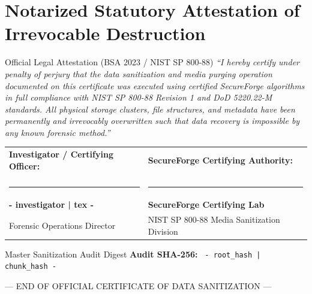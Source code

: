 \documentclass[12pt]{article}
\begin{document}
\section{Notarized Statutory Attestation of Irrevocable Destruction}

\begin{statutorybox}{Official Legal Attestation (BSA 2023 / NIST SP 800-88)}
\textit{``I hereby certify under penalty of perjury that the data sanitization and media purging operation documented on this certificate was executed using certified SecureForge algorithms in full compliance with NIST SP 800-88 Revision 1 and DoD 5220.22-M standards. All physical storage clusters, file structures, and metadata have been permanently and irrevocably overwritten such that data recovery is impossible by any known forensic method.''}
\end{statutorybox}

\vspace{0.8cm}

\begin{table}[H]
\centering
\noindent
\begin{tabularx}{\textwidth}{XX}
\textbf{Investigator / Certifying Officer:} & \textbf{SecureForge Certifying Authority:} \tabularnewline
\vspace{0.1cm} & \vspace{0.1cm} \tabularnewline
\rule{7.0cm}{0.8pt} & \rule{7.0cm}{0.8pt} \tabularnewline
\textbf{ {{- investigator | tex -}} } & \textbf{SecureForge Certifying Lab} \tabularnewline
Forensic Operations Director & NIST SP 800-88 Media Sanitization Division \tabularnewline
\end{tabularx}
\end{table}

\vspace{0.2cm}
\begin{infocard}{Master Sanitization Audit Digest}
\noindent
\textbf{Audit SHA-256:} {\small\texttt{ {{- root_hash | chunk_hash -}} }}
\end{infocard}

\vfill
\begin{center}
\small\textcolor{neutralgray}{--- END OF OFFICIAL CERTIFICATE OF DATA SANITIZATION ---}
\end{center}
\end{document}
